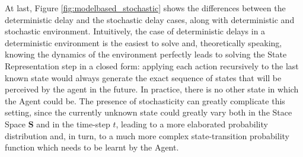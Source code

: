                 At last, Figure \ref{fig:modelbased_stochastic} shows the differences between the deterministic delay and the stochastic delay cases, along with deterministic and stochastic environment. Intuitively, the case of deterministic delays in a deterministic environment is the easiest to solve and, theoretically speaking, knowing the dynamics of the environment perfectly leads to solving the State Representation step in a closed form: applying each action recursively to the last known state would always generate the exact sequence of states that will be perceived by the agent in the future. In practice, there is no other state in which the Agent could be. The presence of stochasticity can greatly complicate this setting, since the currently unknown state could greatly vary both in the Stace Space $\mathbf{S}$ and in the time-step $t$, leading to a more elaborated probability distribution and, in turn, to a much more complex state-transition probability function which needs to be learnt by the Agent. 
                
